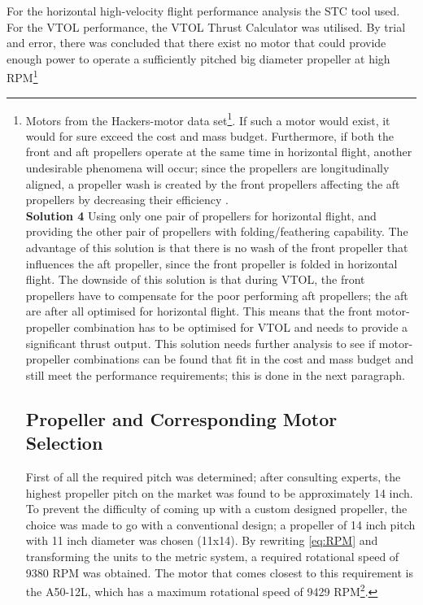For the horizontal high-velocity flight performance analysis the STC tool used. For the VTOL performance, the VTOL Thrust Calculator was utilised. By trial and error, there was concluded that there exist no motor that could provide enough power to operate a sufficiently pitched big diameter propeller at high RPM\footnote{Motors from the Hackers-motor data set\footnote{Motors from the Hackers-motor data set}. If such a motor would exist, it would for sure exceed the cost and mass budget. Furthermore, if both the front and aft propellers operate at the same time in horizontal flight, another undesirable phenomena will occur; since the propellers are longitudinally aligned, a propeller wash is created by the front propellers affecting the aft propellers by decreasing their efficiency \cite{wash}.\\ 

\noindent \textbf{Solution 4} Using only one pair of propellers for horizontal flight, and providing the other pair of propellers with folding/feathering capability. The advantage of this solution is that there is no wash of the front propeller that influences the aft propeller, since the front propeller is folded in horizontal flight. The downside of this solution is that during VTOL, the front propellers have to compensate for the poor performing aft propellers; the aft are after all optimised for horizontal flight. This means that the front motor-propeller combination has to be optimised for VTOL and needs to provide a significant thrust output. This solution needs  further analysis to see if motor-propeller combinations can be found that fit in the cost and mass budget and still meet the performance requirements; this is done in the next paragraph. %




\subsection{Propeller and Corresponding Motor Selection}
First of all the required pitch was determined; after consulting experts, the highest propeller pitch on the market was found to be approximately 14 inch. To prevent the difficulty of coming up with a custom designed propeller, the choice was made to go with a conventional design; a propeller of 14 inch pitch with 11 inch diameter was chosen (11x14). By rewriting \autoref{eq:RPM} and transforming the units to the metric system, a required rotational speed of 9380 RPM was obtained. The motor that comes closest to this requirement is the A50-12L, which has a maximum rotational speed of 9429 RPM\footnote{\url{https://www.hacker-motor-shop.com/Brushless-Motors/Glider-drives/Glider-10kg/A50-12-L-V4.htm?shop=hacker_e&SessionId=&a=article&ProdNr=15726840&p=7202}, Accessed 22-06-2017}. 

}
